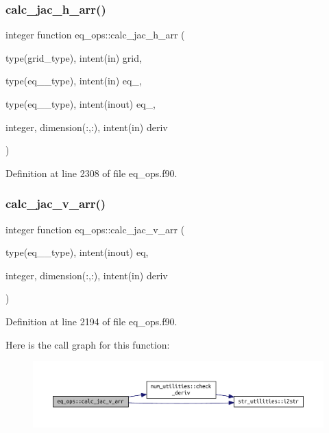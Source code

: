 \subsubsection{\texorpdfstring{calc\+\_\+jac\+\_\+h\+\_\+arr()}{calc\_jac\_h\_arr()}}
{\footnotesize\ttfamily integer function eq\+\_\+ops\+::calc\+\_\+jac\+\_\+h\+\_\+arr (\begin{DoxyParamCaption}\item[{type(grid\+\_\+type), intent(in)}]{grid,  }\item[{type(eq\+\_\+1\+\_\+type), intent(in)}]{eq\+\_,  }\item[{type(eq\+\_\+2\+\_\+type), intent(inout)}]{eq\+\_,  }\item[{integer, dimension(\+:,\+:), intent(in)}]{deriv }\end{DoxyParamCaption})}



Definition at line 2308 of file eq\+\_\+ops.\+f90.

\mbox{\label{namespaceeq__ops_a1a5caa4fb90d75a3f19aba94f98417e0}} 
\subsubsection{\texorpdfstring{calc\+\_\+jac\+\_\+v\+\_\+arr()}{calc\_jac\_v\_arr()}}
{\footnotesize\ttfamily integer function eq\+\_\+ops\+::calc\+\_\+jac\+\_\+v\+\_\+arr (\begin{DoxyParamCaption}\item[{type(eq\+\_\+2\+\_\+type), intent(inout)}]{eq,  }\item[{integer, dimension(\+:,\+:), intent(in)}]{deriv }\end{DoxyParamCaption})}



Definition at line 2194 of file eq\+\_\+ops.\+f90.

Here is the call graph for this function\+:
\nopagebreak
\begin{figure}[H]
\begin{center}
\leavevmode
\includegraphics[width=350pt]{namespaceeq__ops_a1a5caa4fb90d75a3f19aba94f98417e0_cgraph}
\end{center}
\end{figure}
\mbox{\label{namespaceeq__ops_a09b10d95cd83c89e817664a954f7555d}} 
